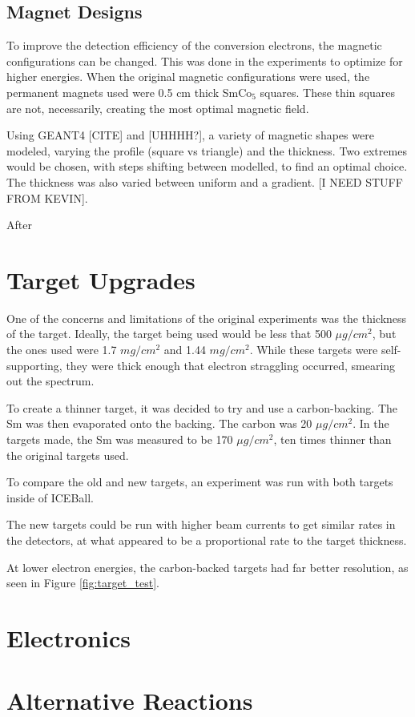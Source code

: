 

\subsection{Magnet Designs}

To improve the detection efficiency of the conversion electrons, the magnetic configurations can be changed. This was done in the experiments to optimize for higher energies. When the original magnetic configurations were used, the permanent magnets used were 0.5 cm thick SmCo$_5$ squares. These thin squares are not, necessarily, creating the most optimal magnetic field.

Using GEANT4 [CITE] and [UHHHH?], a variety of magnetic shapes were modeled, varying the profile (square vs triangle) and the thickness. Two extremes would be chosen, with steps shifting between modelled, to find an optimal choice. The thickness was also varied between uniform and a gradient. [I NEED STUFF FROM KEVIN].

After 

\section{Target Upgrades}

One of the concerns and limitations of the original experiments was the thickness of the target. Ideally, the target being used would be less that 500 $\mu g/cm^2$, but the ones used were 1.7 $mg/cm^2$ and 1.44 $mg/cm^2$. While these targets were self-supporting, they were thick enough that electron straggling occurred, smearing out the spectrum.

To create a thinner target, it was decided to try and use a carbon-backing. The Sm was then evaporated onto the backing. The carbon was 20 $\mu g/cm^2$. In the targets made, the Sm was measured to be 170 $\mu g/cm^2$, ten times thinner than the original targets used.

To compare the old and new targets, an experiment was run with both targets inside of ICEBall. 

The new targets could be run with higher beam currents to get similar rates in the detectors, at what appeared to be a proportional rate to the target thickness.

At lower electron energies, the carbon-backed targets had far better resolution, as seen in Figure \ref{fig:target_test}.





\section{Electronics}

\section{Alternative Reactions}
